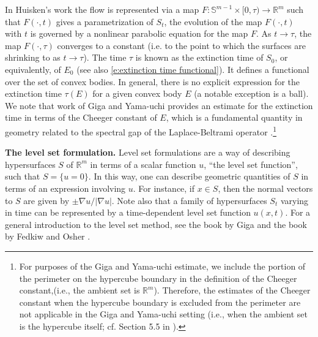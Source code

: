 \documentclass[reqno]{amsart}
\numberwithin{equation}{section}
\newcommand{\R}{\mathbb R}
\begin{document}
In Huisken's work the flow is represented via a map $F:\mathbb{S}^{m-1}\times [0,\tau) \to \mathbb{R}^m$ such that $F(\cdot,t)$ gives a parametrization of $S_t$, the evolution of the map $F(\cdot,t)$ with $t$ is governed by a nonlinear parabolic equation for the map $F$. As $t\to \tau$, the map $F(\cdot,\tau)$ converges to a constant (i.e. to the point to which the surfaces are shrinking to as $t\to \tau$). The time $\tau$ is known as the extinction time of $S_0$, or equivalently, of $E_0$ (see also \eqref{e:extinction time functional}). It defines a functional over the set  of convex bodies. In general, there is no explicit expression for the extinction time $\tau(E)$ for a given convex body $E$ (a notable exception is a ball). We note that work of Giga and Yama-uchi \cite{GigaYamauchi1993} provides an estimate for the extinction time in terms of the Cheeger constant of $E$, which is a fundamental quantity in geometry related to the  spectral gap of the Laplace-Beltrami operator \cite{Cheeger70}.\footnote{For purposes of the  Giga and Yama-uchi estimate, we include the portion of the perimeter on the hypercube boundary  in the definition of the Cheeger constant,(i.e., the ambient set is $\R^m$).  Therefore, the  estimates of the  Cheeger constant when  the hypercube boundary is excluded from the perimeter are not applicable in the  Giga and Yama-uchi setting (i.e., when the ambient set is the hypercube   itself; cf. Section 5.5 in \cite{Milman09}).}
 


\textbf{The level set formulation.} Level set formulations are a way of describing hypersurfaces $S$ of $\mathbb{R}^m$ in terms of a scalar function $u$, ``the level set function'', such that $S = \{u=0\}$. In this way, one can describe geometric quantities of $S$ in terms of an expression involving $u$. For instance, if $x\in S$, then the normal vectors to $S$ are given by $\pm \nabla u / |\nabla u|$. Note also that a family of hypersurfaces $S_t$ varying in time can be represented by a time-dependent level set function $u(x,t)$. For a general introduction to the level set method, see the book by Giga \cite{giga2006surface} and the book by Fedkiw and Osher \cite{osher2004level}. 
\end{document}
